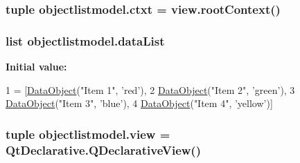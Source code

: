 \subsubsection[{ctxt}]{\setlength{\rightskip}{0pt plus 5cm}tuple objectlistmodel.\+ctxt = view.\+root\+Context()}\label{namespaceobjectlistmodel_af873ed3af799c30194de5e894ea7d706}
\hypertarget{namespaceobjectlistmodel_aa46cee25e481d86da7227932f94c48c2}{}
\subsubsection[{data\+List}]{\setlength{\rightskip}{0pt plus 5cm}list objectlistmodel.\+data\+List}\label{namespaceobjectlistmodel_aa46cee25e481d86da7227932f94c48c2}
{\bfseries Initial value\+:}
\begin{DoxyCode}
1 = [\hyperlink{classobjectlistmodel_1_1DataObject}{DataObject}(\textcolor{stringliteral}{"Item 1"}, \textcolor{stringliteral}{'red'}),
2                 \hyperlink{classobjectlistmodel_1_1DataObject}{DataObject}(\textcolor{stringliteral}{"Item 2"}, \textcolor{stringliteral}{'green'}),
3                 \hyperlink{classobjectlistmodel_1_1DataObject}{DataObject}(\textcolor{stringliteral}{"Item 3"}, \textcolor{stringliteral}{'blue'}),
4                 \hyperlink{classobjectlistmodel_1_1DataObject}{DataObject}(\textcolor{stringliteral}{"Item 4"}, \textcolor{stringliteral}{'yellow'})]
\end{DoxyCode}
\hypertarget{namespaceobjectlistmodel_aec05dc7eb9ce37f90feaed5c139ebb3a}{}
\subsubsection[{view}]{\setlength{\rightskip}{0pt plus 5cm}tuple objectlistmodel.\+view = Qt\+Declarative.\+Q\+Declarative\+View()}\label{namespaceobjectlistmodel_aec05dc7eb9ce37f90feaed5c139ebb3a}
